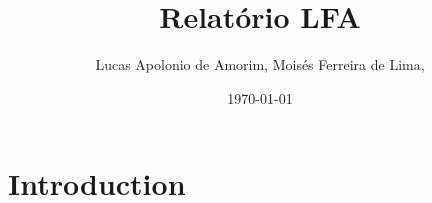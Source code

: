 \documentclass{article}
\title{Relatório LFA}
\author{Lucas Apolonio de Amorim, Moisés Ferreira de Lima,} %
\date{\today}
\begin{document}
\maketitle

\section{Introduction}
\end{document}
